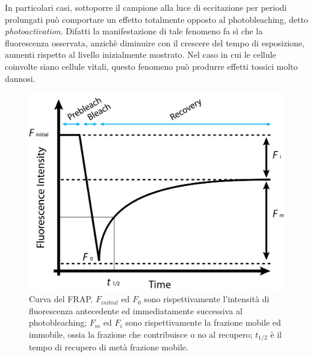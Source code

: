 In particolari casi, sottoporre il campione alla luce di eccitazione per periodi prolungati può comportare un effetto totalmente opposto al photobleaching, detto \textit{photoactivation}. 
Difatti la manifestazione di tale fenomeno fa sì che la fluorescenza osservata, anzichè diminuire con il crescere del tempo di esposizione, aumenti rispetto al livello inizialmente mostrato. 
Nel caso in cui le cellule coinvolte siano cellule vitali, questo fenomeno può produrre effetti tossici molto dannosi.

\begin{figure}
 \centering
 \includegraphics[scale=1]{img/CAP1FRAP.png}
 \caption{\small{Curva del FRAP. $F_{initial}$ ed $F_0$ sono rispettivamente l'intensità di fluorescenza antecedente ed immediatamente successiva al photobleaching; $F_m$ ed $F_i$ sono rispettivamente la frazione mobile ed immobile, ossia la frazione che contribuisce o no al recupero; $t_{1/2}$ è il tempo di recupero di metà frazione mobile.}}
 \label{fig:FRAP}
\end{figure}

